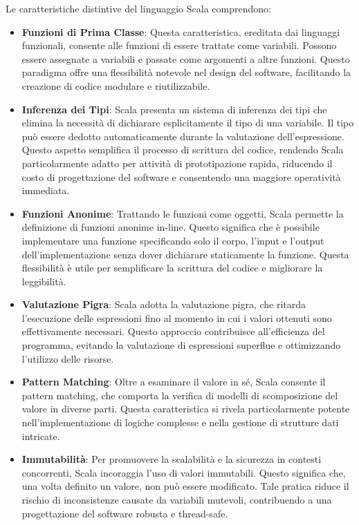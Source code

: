 Le caratteristiche distintive del linguaggio Scala comprendono:
\begin{itemize}
  \item \textbf{Funzioni di Prima Classe}: Questa caratteristica, ereditata dai linguaggi funzionali, consente alle funzioni di essere trattate come variabili.
  Possono essere assegnate a variabili e passate come argomenti a altre funzioni.
  Questo paradigma offre una flessibilità notevole nel design del software, facilitando la creazione di codice modulare e riutilizzabile.
  \item \textbf{Inferenza dei Tipi}: Scala presenta un sistema di inferenza dei tipi che elimina la necessità di dichiarare esplicitamente il tipo di una variabile.
  Il tipo può essere dedotto automaticamente durante la valutazione dell'espressione.
  Questo aspetto semplifica il processo di scrittura del codice, rendendo Scala particolarmente adatto per attività di prototipazione rapida, riducendo il costo di progettazione del software e consentendo una maggiore operatività immediata.
  \item \textbf{Funzioni Anonime}: Trattando le funzioni come oggetti, Scala permette la definizione di funzioni anonime in-line.
  Questo significa che è possibile implementare una funzione specificando solo il corpo, l'input e l'output dell'implementazione senza dover dichiarare staticamente la funzione.
  Questa flessibilità è utile per semplificare la scrittura del codice e migliorare la leggibilità.
  \item \textbf{Valutazione Pigra}: Scala adotta la valutazione pigra, che ritarda l'esecuzione delle espressioni fino al momento in cui i valori ottenuti sono effettivamente necessari.
  Questo approccio contribuisce all'efficienza del programma, evitando la valutazione di espressioni superflue e ottimizzando l'utilizzo delle risorse.
  \item \textbf{Pattern Matching}: Oltre a esaminare il valore in sé, Scala consente il pattern matching, che comporta la verifica di modelli di scomposizione del valore in diverse parti.
  Questa caratteristica si rivela particolarmente potente nell'implementazione di logiche complesse e nella gestione di strutture dati intricate.
  \item \textbf{Immutabilità}: Per promuovere la scalabilità e la sicurezza in contesti concorrenti, Scala incoraggia l'uso di valori immutabili.
  Questo significa che, una volta definito un valore, non può essere modificato.
  Tale pratica riduce il rischio di inconsistenze causate da variabili mutevoli, contribuendo a una progettazione del software robusta e thread-safe.

\end{itemize}
